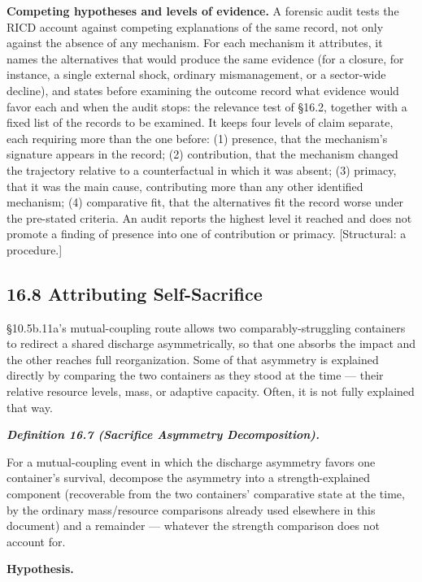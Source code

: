 \documentclass[
]{article}
\begin{document}
\textbf{Competing hypotheses and levels of evidence.} A forensic audit
tests the RICD account against competing explanations of the same
record, not only against the absence of any mechanism. For each
mechanism it attributes, it names the alternatives that would produce
the same evidence (for a closure, for instance, a single external shock,
ordinary mismanagement, or a sector-wide decline), and states before
examining the outcome record what evidence would favor each and when the
audit stops: the relevance test of §16.2, together with a fixed list of
the records to be examined. It keeps four levels of claim separate, each
requiring more than the one before: (1) presence, that the mechanism's
signature appears in the record; (2) contribution, that the mechanism
changed the trajectory relative to a counterfactual in which it was
absent; (3) primacy, that it was the main cause, contributing more than
any other identified mechanism; (4) comparative fit, that the
alternatives fit the record worse under the pre-stated criteria. An
audit reports the highest level it reached and does not promote a
finding of presence into one of contribution or primacy. {[}Structural:
a procedure.{]}

\hypertarget{attributing-self-sacrifice}{%
\subsection{16.8 Attributing
Self-Sacrifice}\label{attributing-self-sacrifice}}

§10.5b.11a's mutual-coupling route allows two comparably-struggling
containers to redirect a shared discharge asymmetrically, so that one
absorbs the impact and the other reaches full reorganization. Some of
that asymmetry is explained directly by comparing the two containers as
they stood at the time --- their relative resource levels, mass, or
adaptive capacity. Often, it is not fully explained that way.

\emph{\textbf{Definition 16.7 (Sacrifice Asymmetry Decomposition).}}

For a mutual-coupling event in which the discharge asymmetry favors one
container's survival, decompose the asymmetry into a strength-explained
component (recoverable from the two containers' comparative state at the
time, by the ordinary mass/resource comparisons already used elsewhere
in this document) and a remainder --- whatever the strength comparison
does not account for.

\textbf{Hypothesis.}
\end{document}
